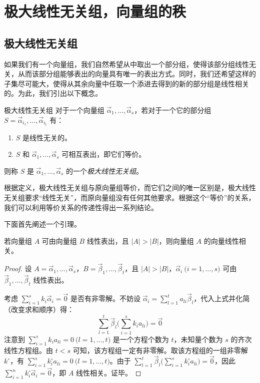 
\section{极大线性无关组，向量组的秩}

\subsection{极大线性无关组}

如果我们有一个向量组，我们自然希望从中取出一个部分组，使得该部分组线性无关，从而该部分组能够表出的向量具有唯一的表出方式。同时，我们还希望这样的子集尽可能大，使得从其余向量中任取一个添进去得到的新的部分组是线性相关的。为此，我们引出以下概念。

\begin{definition}{极大线性无关组}
	对于一个向量组 $\vec \alpha_1, \ldots, \vec \alpha_s$，若对于一个它的部分组 $S = \vec \alpha_{i_1}, \ldots, \vec \alpha_{i_t}$ 有：

	\begin{enumerate}
		\item $S$ 是线性无关的。
		\item $S$ 和 $\vec \alpha_1, \ldots, \vec \alpha_s$ 可相互表出，即它们等价。
	\end{enumerate}

	则称 $S$ 是 $\vec \alpha_1, \ldots, \vec \alpha_s$ 的一个\emph{极大线性无关组}。
\end{definition}

根据定义，极大线性无关组与原向量组等价，而它们之间的唯一区别是，极大线性无关组要求“线性无关”，而原向量组没有任何其他要求。根据这个“等价”的关系，我们可以利用等价关系的传递性得出一系列结论。

下面首先阐述一个引理。

\begin{theorem}
	若向量组 $A$ 可由向量组 $B$ 线性表出，且 $|A| > |B|$，则向量组 $A$ 的向量线性相关。
\end{theorem}

\begin{proof}
	设 $A = \vec \alpha_1, \ldots, \vec \alpha_s$，$B = \vec \beta_1, \ldots, \vec \beta_t$，且 $|A| > |B|$，$\vec \alpha_i \pod{i = 1, \ldots, s}$ 可由 $\vec \beta_1, \ldots, \vec \beta_t$ 线性表出。

	考虑 $\sum\limits_{i = 1}^s k_i \vec \alpha_i = \vec 0$ 是否有非零解。不妨设 $\vec \alpha_i = \sum\limits_{l = 1}^t a_{li} \vec \beta_l$，代入上式并化简（改变求和顺序）得：
	$$
	\sum_{l = 1}^t \vec \beta_l \biggl( \sum_{i = 1}^s k_i a_{li} \biggr) = \vec 0
	$$
	注意到 $\sum\limits_{i = 1}^s k_i a_{li} = 0 \pod{l = 1, \ldots, t}$ 是一个方程个数为 $t$，未知量个数为 $s$ 的齐次线性方程组。由 $t < s$ 可知，该方程组一定有非零解。取该方程组的一组非零解 $k^\circ$，有 $\sum\limits_{i = 1}^s k^\circ_i a_{li} = 0 \pod{l = 1, \ldots, t}$。由于 $\sum\limits_{l = 1}^t \vec \beta_l \biggl( \sum\limits_{i = 1}^s k^\circ_i a_{li} \biggr) = \vec 0$，因此 $\sum\limits_{i = 1}^n k^\circ_i \vec \alpha_i = \vec 0$，即 $A$ 线性相关。证毕。
\end{proof}

